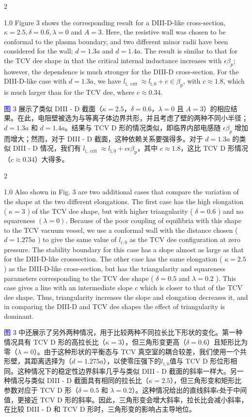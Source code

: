 \documentclass[utf8]{ctexart}
\newcommand\enzhbox[2]{
  	\quad\par \begin{paracol}{2} \colseprulecolor{black} 
  		\begin{spacing}{1.0}
  			\footnotesize  #1
  		\end{spacing}
  		\switchcolumn[1] 
  		#2
  	\end{paracol} \quad\par
  }
\begin{document}
\begin{sloppypar}
  
 
\enzhbox{  Figure 3 shows the corresponding result for a DIII-D-like cross-section, $\kappa=2.5, \delta=0.6, \lambda=0$ and $A=3$. Here, the resistive wall was chosen to be conformal to the plasma boundary, and two different minor radii have been considered for the wall; $d=1.3 a$ and $d=1.4 a$. The result is similar to that for the TCV dee shape in that the critical internal inductance increases with $\epsilon \beta_{p}$; however, the dependence is much stronger for the DIII-D cross-section. For the DIII-D-like case with $d=1.3 a$, we have $l_{\mathrm{i}, \text { crit }} \approx l_{\mathrm{i}, 0}+c \in \beta_{\mathrm{p}}$, with $c \approx 1.8$, which is much larger than for the TCV dee, where $c \approx 0.34$.}{
\textcolor{blue}{图 3} 展示了类似 DIII - D 截面（$\kappa = 2.5$，$\delta = 0.6$，$\lambda = 0$ 且 $A = 3$）的相应结果。在此，电阻壁被选为与等离子体边界共形，并且考虑了壁的两种不同小半径；$d = 1.3a$ 和 $d = 1.4a$。结果与 TCV D 形的情况类似，即临界内部电感随 $\epsilon \beta_{p}$ 增加而增大；然而，对于 DIII - D 截面，这种依赖关系要强得多。对于 $d = 1.3a$ 的类似 DIII - D 情况，我们有 $l_{\mathrm{i}, \text { crit }} \approx l_{\mathrm{i}, 0} + c \epsilon \beta_{\mathrm{p}}$，其中 $c \approx 1.8$，这比 TCV D 形情况（$c \approx 0.34$）大得多。 }
  
 
\enzhbox{  Also shown in Fig. 3 are two additional cases that compare the variation of the shape at the two different elongations. The first case has the high elongation ( $\kappa=3$ ) of the TCV dee shape, but with higher triangularity ( $\delta=0.6$ ) and no squareness $(\lambda=0)$. Because of the poor coupling of equilibria with this shape to the TCV vacuum vessel, we use a conformal wall with the distance chosen ( $d=1.275 a$ ) to give the same value of $l_{i, 0}$ as the TCV dee configuration at zero pressure. The stability boundary for this case has a slope almost as large as that for the DIII-D-like crosssection. The other case has the same elongation ( $\kappa=2.5$ ) as the DIII-D-like cross-section, but has the triangularity and squareness parameters corresponding to the TCV dee shape ( $\delta=0.5$ and $\lambda=0.2$ ). This case gives a line with an intermediate slope $c$ which is closer to that of the TCV dee shape. Thus, triangularity increases the slope and elongation decreases it, and in comparing the DIII-D and TCV dee shapes the effect of triangularity is dominant.}{
\textcolor{blue}{图 3} 中还展示了另外两种情况，用于比较两种不同拉长比下形状的变化。第一种情况具有 TCV D 形的高拉长比（$\kappa = 3$），但三角形变更高（$\delta = 0.6$）且矩形比为零（$\lambda = 0$）。由于这种形状的平衡态与 TCV 真空室的耦合较差，我们使用一个共形壁，其距离选择为（$d = 1.275a$），以使零压强下的$l_{i, 0}$值与 TCV D 形位形相同。这种情况下的稳定性边界斜率几乎与类似 DIII - D 截面的斜率一样大。另一种情况与类似 DIII - D 截面具有相同的拉长比（$\kappa = 2.5$），但三角形变和矩形比参数对应于 TCV D 形（$\delta = 0.5$ 和 $\lambda = 0.2$）。这种情况给出的直线斜率$c$处于中间值，更接近 TCV D 形的斜率。因此，三角形变会增大斜率，拉长比会减小斜率，在比较 DIII - D 和 TCV D 形时，三角形变的影响占主导地位。 }
  

\end{sloppypar}
\end{document}
